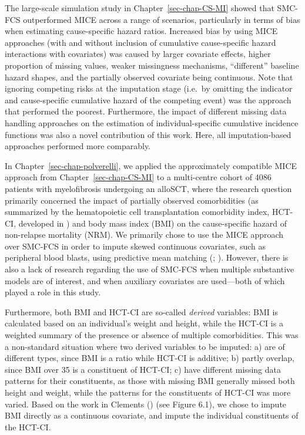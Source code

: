 \documentclass[
  letterpaper,
  DIV=11,
  numbers=noendperiod]{scrreprt}
\begin{document}
The large-scale simulation study in Chapter~\ref{sec-chap-CS-MI} showed
that SMC-FCS outperformed MICE across a range of scenarios, particularly
in terms of bias when estimating cause-specific hazard ratios. Increased
bias by using MICE approaches (with and without inclusion of cumulative
cause-specific hazard interactions with covariates) was caused by larger
covariate effects, higher proportion of missing values, weaker
missingness mechanisms, ``different'' baseline hazard shapes, and the
partially observed covariate being continuous. Note that ignoring
competing risks at the imputation stage (i.e.~by omitting the indicator
and cause-specific cumulative hazard of the competing event) was the
approach that performed the poorest. Furthermore, the impact of
different missing data handling approaches on the estimation of
individual-specific cumulative incidence functions was also a novel
contribution of this work. Here, all imputation-based approaches
performed more comparably.

In Chapter~\ref{sec-chap-polverelli}, we applied the approximately
compatible MICE approach from Chapter~\ref{sec-chap-CS-MI} to a
multi-centre cohort of 4086 patients with myelofibrosis undergoing an
alloSCT, where the research question primarily concerned the impact of
partially observed comorbidities (as summarized by the hematopoietic
cell transplantation comorbidity index, HCT-CI, developed in
) and body mass index (BMI) on the cause-specific
hazard of non-relapse mortality (NRM). We primarily chose to use the
MICE approach over SMC-FCS in order to impute skewed continuous
covariates, such as peripheral blood blasts, using predictive mean
matching (; ). However, there is also a lack of research regarding the use of
SMC-FCS when multiple substantive models are of interest, and when
auxiliary covariates are used---both of which played a role in this
study.

Furthermore, both BMI and HCT-CI are so-called \emph{derived} variables:
BMI is calculated based on an individual's weight and height, while the
HCT-CI is a weighted summary of the presence or absence of multiple
comorbidities. This was a non-standard situation where two derived
variables to be imputed: a) are of different types, since BMI is a ratio
while HCT-CI is additive; b) partly overlap, since BMI over 35 is a
constituent of HCT-CI; c) have different missing data patterns for their
constituents, as those with missing BMI generally missed both height and
weight, while the patterns for the constituents of HCT-CI was more
varied. Based on the work in Clements
() (see Figure
6.1), we chose to impute BMI directly as a continuous covariate, and
impute the individual constituents of the HCT-CI.
\end{document}
